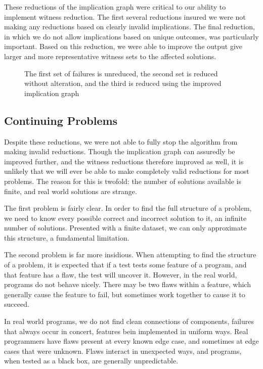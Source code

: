 \documentclass[11pt]{article}
\begin{document}
These reductions of the implication graph were critical to our ability to implement witness reduction. The first several reductions insured we were not making any reductions based on clearly invalid implications. The final reduction, in which we do not allow implications based on unique outcomes, was particularly important. Based on this reduction, we were able to improve the output give larger and more representative witness sets to the affected solutions.

\begin{figure}



\caption{The first set of failures is unreduced, the second set is reduced without alteration, and the third is reduced using the improved implication graph}
\end{figure}

\subsection{Continuing Problems}

Despite these reductions, we were not able to fully stop the algorithm from making invalid reductions. Though the implication graph can assuredly be improved further, and the witness reductions therefore improved as well, it is unlikely that we will ever be able to make completely valid reductions for most problems. The reason for this is twofold: the number of solutions available is finite, and  real world solutions are strange.

The first problem is fairly clear. In order to find the full structure of a problem, we need to know every possible correct and incorrect solution to it, an infinite  number of solutions. Presented with a finite dataset, we can only approximate this structure, a fundamental limitation.

The second problem is far more insidious. When attempting to find the structure of a problem, it is expected that if a test tests some feature of a program, and that feature has a flaw, the test will uncover it. However, in the real world, programs do not behave nicely. There may be two flaws within a feature, which generally cause the feature to fail, but sometimes work together to cause it to succeed.

In real world programs, we do not find clean connections of components, failures that always occur in concert, features bein implemented in uniform ways. Real programmers have flaws present at every known edge case, and sometimes at edge cases that were unknown. Flaws interact in unexpected ways, and programs, when tested as a black box, are generally unpredictable.
\end{document}
